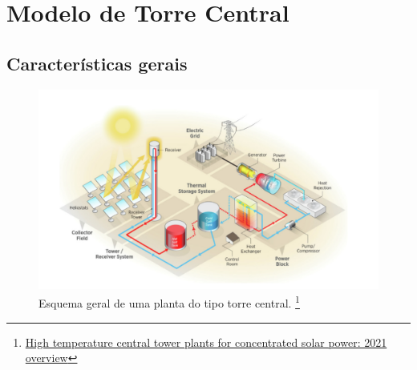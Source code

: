 \documentclass[12pt,notheorems,hyperref={pdfauthor= Rafael Nardi}]{beamer}
\begin{document}
\section{Modelo de Torre Central}

\subsection{Características gerais}

\begin{frame}%
	\begin{figure}
		\centering
		\includegraphics[scale=0.3]{./sistema_usina.png}
		\caption{Esquema geral de uma planta do tipo torre central. \footnote{\href{https://reader.elsevier.com/reader/sd/pii/S1364032121010923}{High temperature central tower plants for concentrated solar power: 2021 overview}}}
	\end{figure}
\end{frame}
\end{document}
